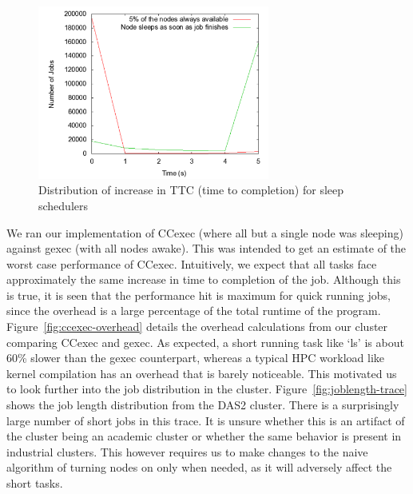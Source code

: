 \begin{figure}[ht]
\centering
\begin{center}
\includegraphics[width=3.0in]{graphs/overhead-time.pdf}
\vspace{-0.1in}
\caption{{\normalsize Distribution of increase in TTC (time to completion) for sleep schedulers}\label{fig:overhead-time}}
\vspace{-0.1in}
\end{center}
\end{figure}
We ran our implementation of CCexec (where all but a single node was sleeping) against gexec (with all nodes awake). This was intended to get an estimate of the worst case performance of CCexec. Intuitively, we expect that all tasks face approximately the same increase in time to completion of the job. Although this is true, it is seen that the performance hit is maximum for quick running jobs, since the overhead is a large percentage of the total runtime of the program. Figure~\ref{fig:ccexec-overhead} details the overhead calculations from our cluster comparing CCexec and gexec. As expected, a short running task like `ls' is about 60\% slower than the gexec counterpart, whereas a typical HPC workload like kernel compilation has an overhead that is barely noticeable. This motivated us to look further into the job distribution in the cluster. Figure~\ref{fig:joblength-trace} shows the job length distribution from the DAS2 cluster. There is a surprisingly large number of short jobs in this trace. It is unsure whether this is an artifact of the cluster being an academic cluster or whether the same behavior is present in industrial clusters. This however requires us to make changes to the naive algorithm of turning nodes on only when needed, as it will adversely affect the short tasks.


